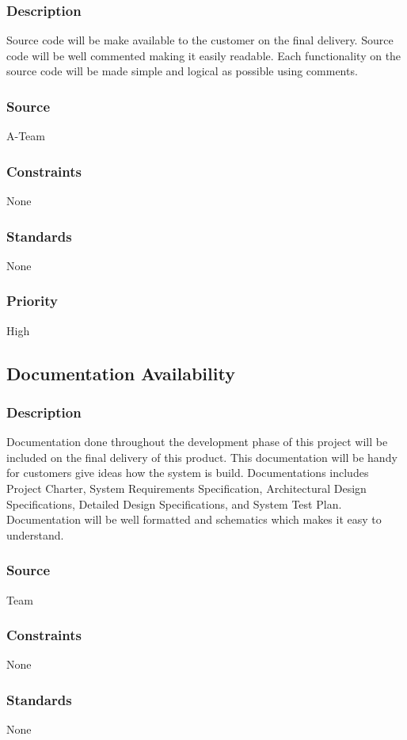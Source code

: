 \subsubsection{Description}
Source code will be make available to the customer on the final delivery. Source code will be well commented making it easily readable. Each functionality on the source code will be made simple and logical as possible using comments. 
\subsubsection{Source}
A-Team 
\subsubsection{Constraints}
None
\subsubsection{Standards}
None
\subsubsection{Priority}
High

\subsection{Documentation Availability}
\subsubsection{Description}
Documentation done throughout the development phase of this project will be included on the final delivery of this product. This documentation will be handy for customers give ideas how the system is build. Documentations includes Project Charter, System Requirements Specification, Architectural Design Specifications, Detailed Design Specifications, and System Test Plan. Documentation will be well formatted and schematics which makes it easy to understand. 
\subsubsection{Source}
Team
\subsubsection{Constraints}
None
\subsubsection{Standards}
None
